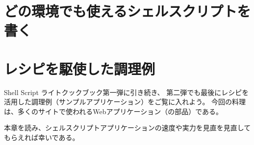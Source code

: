 \documentclass[b5paper,9pt,fleqn,tombow,openany]{jsbook}
\begin{document}


\chapter{どの環境でも使えるシェルスクリプトを書く}
\label{cap:allenvs}



\chapter{レシピを駆使した調理例}

Shell Script ライトクックブック第一弾に引き続き、
第二弾でも最後にレシピを活用した調理例（サンプルアプリケーション）をご覧に入れよう。
今回の料理は、多くのサイトで使われるWebアプリケーション（の部品）である。

本章を読み、シェルスクリプトアプリケーションの速度や実力を見直を見直してもらえれば幸いである。





\backmatter



\end{document}
